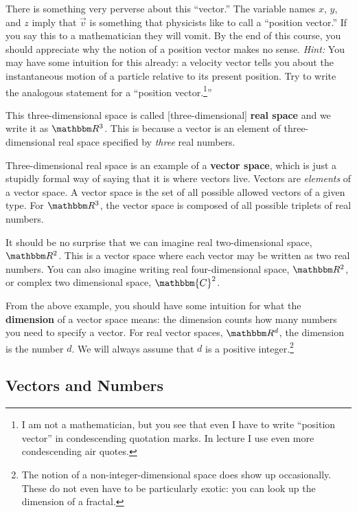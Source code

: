 \documentclass[12pt]{article}
\begin{document}
\begin{exercise}
There is something very perverse about this ``vector.'' The variable names $x$, $y$, and $z$ imply that $\vec{v}$ is something that physicists like to call a ``position vector.'' If you say this to a mathematician they will vomit. By the end of this course, you should appreciate why the notion of a position vector makes no sense. \emph{Hint:} You may have some intuition for this already: a velocity vector tells you about the instantaneous motion of a particle relative to its present position. Try to write the analogous statement for a ``position vector.\footnote{I am not a mathematician, but you see that even I have to write ``position vector'' in condescending quotation marks. In lecture I use even more condescending air quotes.}''
\label{ex:position:vector}
\end{exercise}

This three-dimensional space is called [three-dimensional] \textbf{real space} and we write it as $\RR ^3$. This is because a vector is an element of three-dimensional real space specified by \emph{three} real numbers. 

Three-dimensional real space is an example of a \textbf{vector space}, which is just a stupidly formal way of saying that it is where vectors live. Vectors are \emph{elements} of a vector space. A vector space is the set of all possible allowed vectors of a given type. For $\RR ^3$, the vector space is composed of all possible triplets of real numbers. 


\begin{example} It should be no surprise that we can imagine real two-dimensional space, $\RR ^2$. This is a vector space where each vector may be written as two real numbers. You can also imagine writing real four-dimensional space, $\RR ^2$, or complex two dimensional space, $\mathbbm{C}^2$. 
\end{example}

From the above example, you should have some intuition for what the \textbf{dimension} of a vector space means: the dimension counts how many numbers you need to specify a vector. For real vector spaces, $\RR ^d$, the dimension is the number $d$. We will always assume that $d$ is a positive integer.\footnote{The notion of a non-integer-dimensional space does show up occasionally. These do not even have to be particularly exotic: you can look up the dimension of a fractal.}

\subsection{Vectors and Numbers}
\end{document}
